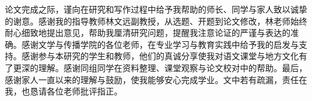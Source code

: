 
论文完成之际，谨向在研究和写作过程中给予我帮助的师长、同学与家人致以诚挚的谢意。感谢我的指导教师林文远副教授，从选题、开题到论文修改，林老师始终耐心细致地提出意见，帮助我厘清研究问题，提醒我注意论证的严谨与表达的准确。感谢文学与传播学院的各位老师，在专业学习与教育实践中给予我的启发与支持。感谢参与本研究的学生和教师，他们的真诚分享使我对语文课堂与地方文化有了更深的理解。感谢同组同学在资料整理、课堂观察与论文校对中的帮助。最后，感谢家人一直以来的理解与鼓励，使我能够安心完成学业。文中若有疏漏，责任在我，也恳请各位老师批评指正。

